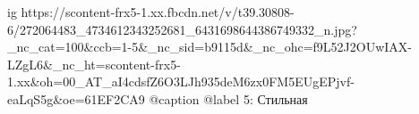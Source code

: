  
 
 
 
 

\ifcmt
  ig https://scontent-frx5-1.xx.fbcdn.net/v/t39.30808-6/272064483_4734612343252681_6431698644386749332_n.jpg?_nc_cat=100&ccb=1-5&_nc_sid=b9115d&_nc_ohc=f9L52J2OUwIAX-LZgL6&_nc_ht=scontent-frx5-1.xx&oh=00_AT_aI4cdsfZ6O3LJh935deM6zx0FM5EUgEPjvf-eaLqS5g&oe=61EF2CA9
  @caption @label 5: Стильная
\fi
